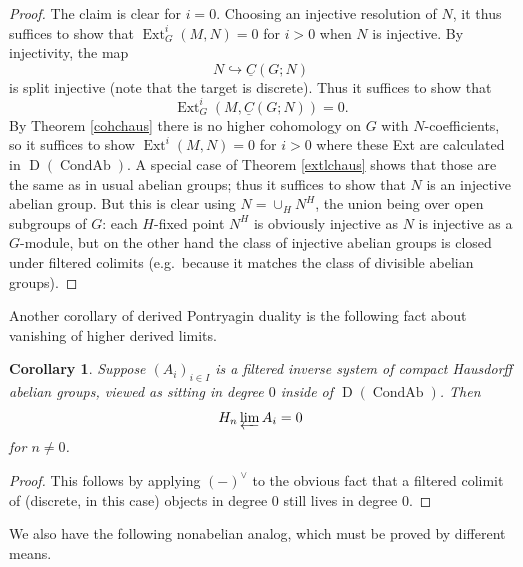 \documentclass[12pt]{article}
\newtheorem{corollary}[theorem]{Corollary}
\theoremstyle{definition}
\newcommand{\on}{\operatorname}
\newcommand{\ul}{\underline}
\begin{document}
\begin{proof}
The claim is clear for $i=0$.  Choosing an injective resolution of $N$, it thus suffices to show that $\on{Ext}_G^i(M,N)=0$ for $i>0$ when $N$ is injective.  By injectivity, the map
$$N \hookrightarrow \ul{C}(G;N)$$
is split injective (note that the target is discrete).  Thus it suffices to show that
$$\on{Ext}^i_G(M,\ul{C}(G;N))=0.$$
By Theorem \ref{cohchaus} there is no higher cohomology on $G$ with $N$-coefficients, so it suffices to show $\on{Ext}^i(M,N)=0$ for $i>0$ where these Ext are calculated in $\on{D}(\on{CondAb})$.  A special case of Theorem \ref{extlchaus} shows that those are the same as in usual abelian groups; thus it suffices to show that $N$ is an injective abelian group.  But this is clear using $N=
\cup_H N^H$, the union being over open subgroups of $G$: each $H$-fixed point $N^H$ is obviously injective as $N$ is injective as a $G$-module, but on the other hand the class of injective abelian groups is closed under filtered colimits (e.g.\ because it matches the class of divisible abelian groups).
\end{proof}

Another corollary of derived Pontryagin duality is the following fact about vanishing of higher derived limits.

\begin{corollary}\label{rlim}
Suppose $(A_i)_{i\in I}$ is a filtered inverse system of compact Hausdorff abelian groups, viewed as sitting in degree $0$ inside of $\on{D}(\on{CondAb})$.  Then
$$H_n \varprojlim A_i=0$$
for $n\neq 0$.
\end{corollary}
\begin{proof}
This follows by applying $(-)^\vee$ to the obvious fact that a filtered colimit of (discrete, in this case) objects in degree $0$ still lives in degree $0$.
\end{proof}

We also have the following nonabelian analog, which must be proved by different means.
\end{document}
